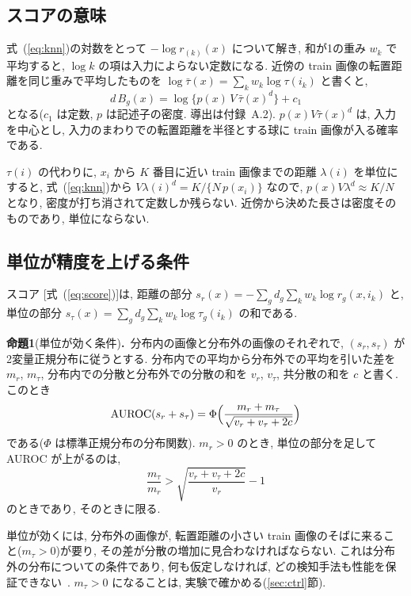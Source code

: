 \documentclass[MIRU,submit]{miru2025j}
\newcommand{\thm}[2]{\par\vspace{0.6mm}\noindent\textbf{#1}#2\textbf{.}\ }             %
\renewcommand{\eqref}[1]{(\ref{#1})}
\begin{document}
\subsection{スコアの意味}
\label{sec:mass}
式~\eqref{eq:knn}の対数をとって $-\log r_{(k)}(x)$ について解き, 和が1の重み $w_k$ で平均すると, $\log k$ の項は入力によらない定数になる. 近傍の train 画像の転置距離を同じ重みで平均したものを $\log\bar{\tau}(x)=\sum_k w_k\log\tau(i_k)$ と書くと,
\begin{equation}
d\,B_g(x)=\log\bigl\{p(x)\,V\,\bar{\tau}(x)^{d}\bigr\}+c_1
\label{eq:mass}
\end{equation}
となる($c_1$ は定数, $p$ は記述子の密度. 導出は付録~A.2). $p(x)V\bar{\tau}(x)^{d}$ は, 入力を中心とし, 入力のまわりでの転置距離を半径とする球に train 画像が入る確率である.

\label{sec:local}
$\tau(i)$ の代わりに, $x_i$ から $K$ 番目に近い train 画像までの距離 $\lambda(i)$ を単位にすると, 式~\eqref{eq:knn}から $V\lambda(i)^{d}=K/\{N\,p(x_i)\}$ なので, $p(x)V\lambda^{d}\approx K/N$ となり, 密度が打ち消されて定数しか残らない. 近傍から決めた長さは密度そのものであり, 単位にならない.

\subsection{単位が精度を上げる条件}
\label{sec:two}
スコア [式~\eqref{eq:score}]は, 距離の部分 $s_r(x)=-\sum_{g}d_g\sum_{k}w_k\log r_g(x,i_k)$ と, 単位の部分 $s_\tau(x)=\sum_{g}d_g\sum_{k}w_k\log\tau_g(i_k)$ の和である.

\thm{命題1}{(単位が効く条件)}分布内の画像と分布外の画像のそれぞれで, $(s_r,s_\tau)$ が2変量正規分布に従うとする. 分布内での平均から分布外での平均を引いた差を $m_r$, $m_\tau$, 分布内での分散と分布外での分散の和を $v_r$, $v_\tau$, 共分散の和を $c$ と書く. このとき
\begin{equation}
\mathrm{AUROC}(s_r+s_\tau)=\Phi\Bigl(\frac{m_r+m_\tau}{\sqrt{v_r+v_\tau+2c}}\Bigr)
\label{eq:two}
\end{equation}
である($\Phi$ は標準正規分布の分布関数). $m_r>0$ のとき, 単位の部分を足して AUROC が上がるのは,
\begin{equation}
\frac{m_\tau}{m_r}>\sqrt{\frac{v_r+v_\tau+2c}{v_r}}-1
\label{eq:cond}
\end{equation}
のときであり, そのときに限る.\par\vspace{0.6mm}

単位が効くには, 分布外の画像が, 転置距離の小さい train 画像のそばに来ること($m_\tau>0$)が要り, その差が分散の増加に見合わなければならない. これは分布外の分布についての条件であり, 何も仮定しなければ, どの検知手法も性能を保証できない~\cite{zhang2021failures}. $m_\tau>0$ になることは, 実験で確かめる(\ref{sec:ctrl}節).
\end{document}
